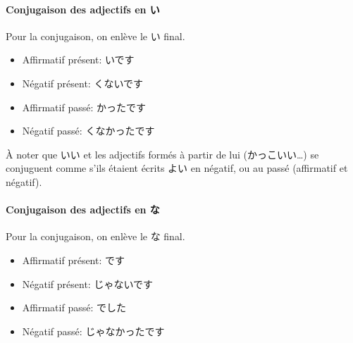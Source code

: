 \documentclass[a4paper,10pt,french,openany]{memoir}
\begin{document}
\paragraph{Conjugaison des adjectifs en い} Pour la conjugaison, on enlève le い final.
\begin{itemize}
 \item Affirmatif présent: いです
 \item Négatif présent: くないです
 \item Affirmatif passé: かったです
 \item Négatif passé: くなかったです
\end{itemize}

À noter que いい et les adjectifs formés à partir de lui (かっこいい\dots) se conjuguent comme s'ils étaient écrits よい en négatif, ou au passé (affirmatif et négatif).

\paragraph{Conjugaison des adjectifs en な} Pour la conjugaison, on enlève le な final.
\begin{itemize}
 \item Affirmatif présent: です
 \item Négatif présent: じゃないです
 \item Affirmatif passé: でした
 \item Négatif passé: じゃなかったです
\end{itemize}
\end{document}
